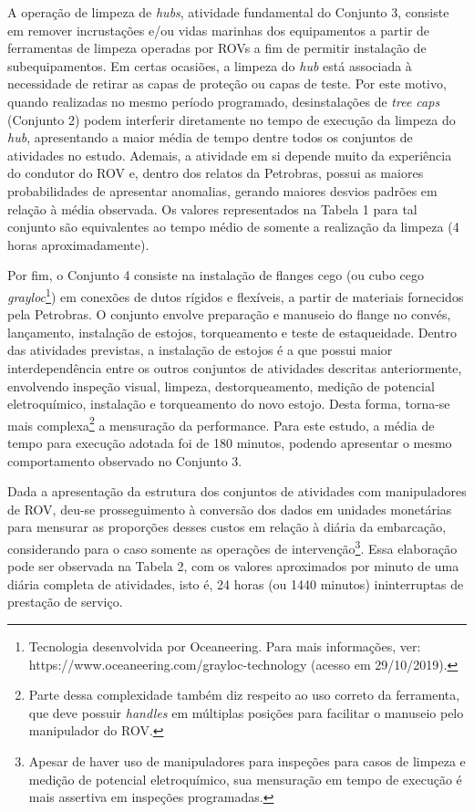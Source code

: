 A operação de limpeza de \textit{hubs}, atividade fundamental do Conjunto 3, consiste em remover incrustações e/ou vidas marinhas dos equipamentos a partir de ferramentas de limpeza operadas por ROVs a fim de permitir instalação de subequipamentos. Em certas ocasiões, a limpeza do \textit{hub} está associada à necessidade de retirar as capas de proteção ou capas de teste. Por este motivo, quando realizadas no mesmo período programado, desinstalações de \textit{tree caps} (Conjunto 2) podem interferir diretamente no tempo de execução da limpeza do \textit{hub}, apresentando a maior média de tempo dentre todos os conjuntos de atividades no estudo. Ademais, a atividade em si depende muito da experiência do condutor do ROV e, dentro dos relatos da Petrobras, possui as maiores probabilidades de apresentar anomalias, gerando maiores desvios padrões em relação à média observada. Os valores representados na Tabela 1 para tal conjunto são equivalentes ao tempo médio de somente a realização da limpeza (4 horas aproximadamente).  

Por fim, o Conjunto 4 consiste na instalação de flanges cego (ou cubo cego \textit{grayloc}\footnote{Tecnologia desenvolvida por Oceaneering. Para mais informações, ver: https://www.oceaneering.com/grayloc-technology (acesso em 29/10/2019).}) em conexões de dutos rígidos e flexíveis, a partir de materiais fornecidos pela Petrobras. O conjunto envolve preparação e manuseio do flange no convés, lançamento, instalação de estojos, torqueamento e teste de estaqueidade. Dentro das atividades previstas, a instalação de estojos é a que possui maior interdependência entre os outros conjuntos de atividades descritas anteriormente, envolvendo inspeção visual, limpeza, destorqueamento, medição de potencial eletroquímico, instalação e torqueamento do novo estojo. Desta forma, torna-se mais complexa\footnote{Parte dessa complexidade também diz respeito ao uso correto da ferramenta, que deve possuir \textit{handles} em múltiplas posições para facilitar o manuseio pelo manipulador do ROV.}  a mensuração da performance. Para este estudo, a média de tempo para execução adotada foi de 180 minutos, podendo apresentar o mesmo comportamento observado no Conjunto 3.  

Dada a apresentação da estrutura dos conjuntos de atividades com manipuladores de ROV, deu-se prosseguimento à conversão dos dados em unidades monetárias para mensurar as proporções desses custos em relação à diária da embarcação, considerando para o caso somente as operações de intervenção\footnote{Apesar de haver uso de manipuladores para inspeções para casos de limpeza e medição de potencial eletroquímico, sua mensuração em tempo de execução é mais assertiva em inspeções programadas.}. Essa elaboração pode ser observada na Tabela 2, com os valores aproximados por minuto de uma diária completa de atividades, isto é, 24 horas (ou 1440 minutos) ininterruptas de prestação de serviço. 

